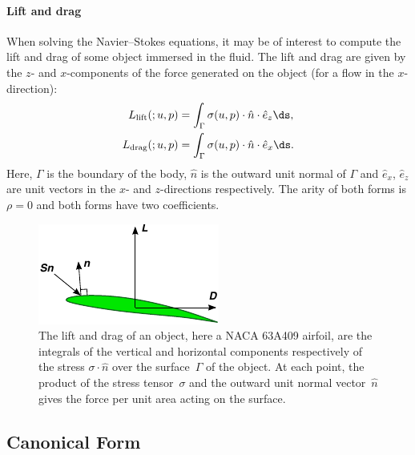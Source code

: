 \paragraph{Lift and drag}

When solving the Navier--Stokes equations, it may be of interest to
compute the lift and drag of some object immersed in the fluid.  The
lift and drag are given by the $z$- and $x$-components of the force
generated on the object (for a flow in the $x$-direction):
\begin{displaymath}
  \begin{split}
    L_{\mathrm{lift}}(;u, p) &= \int_{\Gamma} \sigma(u, p) \cdot \hat{n} \cdot \hat{e}_z \ds, \\
    L_{\mathrm{drag}}(;u, p) &= \int_{\Gamma} \sigma(u, p) \cdot \hat{n} \cdot \hat{e}_x \ds.
  \end{split}
\end{displaymath}
Here, $\Gamma$ is the boundary of the body, $\hat{n}$ is the outward
unit normal of $\Gamma$ and $\hat{e}_x$, $\hat{e}_z$ are unit vectors
in the $x$- and $z$-directions respectively. The arity of both forms
is $\rho = 0$ and both forms have two coefficients.

\begin{figure}
  \begin{center}
    \includegraphics[width=\largefig]{chapters/kirby-5/pdf/lift_drag.pdf}
    \caption{The lift and drag of an object, here a NACA 63A409
      airfoil, are the integrals of the vertical and horizontal
      components respectively of the stress $\sigma \cdot \hat{n}$ over the
      surface~$\Gamma$ of the object. At each point, the product of
      the stress tensor~$\sigma$ and the outward unit normal
      vector~$\hat{n}$ gives the force per unit area acting on the
      surface.}
  \end{center}
\end{figure}

\subsection{Canonical Form}

